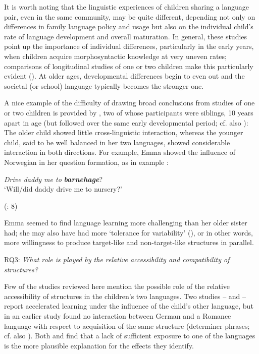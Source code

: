 \documentclass[output=paper]{langscibook}
\begin{document}
It is worth noting that the linguistic experiences of children sharing a language pair, even in the same community, may be quite different, depending not only on differences in family language policy and usage but also on the individual child’s rate of language development and overall maturation. In general, these studies point up the importance of individual differences, particularly in the early years, when children acquire morphosyntactic knowledge at very uneven rates; comparisons of longitudinal studies of one or two children make this particularly evident (\citealt{Serratrice2005}). At older ages, developmental differences begin to even out and the societal (or school) language typically becomes the stronger one.

A nice example of the difficulty of drawing broad conclusions from studies of one or two children is provided by \citet{AndersenBentzen2018}, two of whose participants were siblings, 10 years apart in age (but followed over the same early developmental period; cf. also \citealt{RodinaWestergaard2013}): The older child showed little cross-linguistic interaction, whereas the younger child, said to be well balanced in her two languages, showed considerable interaction in both directions. For example, Emma showed the influence of Norwegian in her question formation, as in example :

\ea%
    \label{ex:vihmannvihmann:7}
     \textit{Drive daddy me to} \textbf{\textit{barnehage}}? \\
\glt `Will/did daddy drive me to nursery?'

(\citealt{AndersenBentzen2018}: 8)
    \z

Emma seemed to find language learning more challenging than her older sister had; she may also have had more ‘tolerance for variability’ (\citealt{CattsDavis1984}), or in other words, more willingness to produce target-like and non-target-like structures in parallel.

RQ3: \textit{What role is played by the relative accessibility and compatibility of structures?}

Few of the studies reviewed here mention the possible role of the relative accessibility of structures in the children’s two languages. Two studies – \citet{Kupisch2007} and \citet{HervéSerratrice2018} – report accelerated learning under the influence of the child’s other language, but in an earlier study \citet{KupischEtAl2002} found no interaction between German and a Romance language with respect to acquisition of the same structure (determiner phrases; cf. also \citealt{EichlerEtAl2012}). Both \citet{KupischEtAl2002} and \citet{Austin2009} find that a lack of sufficient exposure to one of the languages is the more plausible explanation for the effects they identify.
\end{document}
